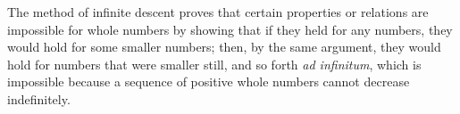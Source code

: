 The method of infinite descent proves that certain properties or relations are impossible for whole numbers by showing that if they held for any numbers, they would hold for some smaller numbers; then, by the same argument, they would hold for numbers that were smaller still, and so forth \textit{ad infinitum}, which is impossible because a sequence of positive whole numbers cannot decrease indefinitely.
